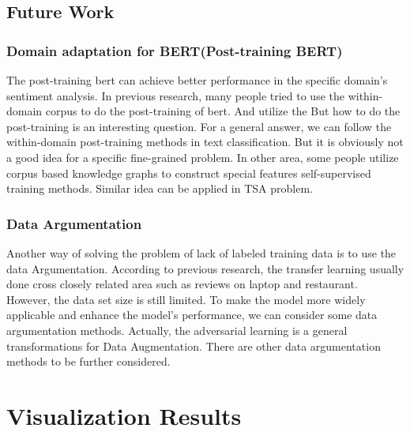 \documentclass[fyp]{socreport}
\begin{document}
\section{Future Work}
\subsection{Domain adaptation for BERT(Post-training BERT)}
The post-training bert can achieve better performance in the specific domain's sentiment analysis. In previous research, many people tried to use the within-domain corpus to do the post-training of bert. And utilize the
But how to do the post-training is an interesting question. For a general answer, we can follow the within-domain post-training methods in text classification. But it is obviously not a good idea for a specific fine-grained problem. In other area, some people utilize corpus based knowledge graphs to construct special features self-supervised training methods. Similar idea can be applied in TSA problem.


\subsection{Data Argumentation}
Another way of solving the problem of lack of labeled training data is to use the data Argumentation. According to previous research, the transfer learning usually done cross closely related area such as reviews on laptop and restaurant. However, the data set size is still limited. To make the model more widely applicable and enhance the model's performance, we can consider some data argumentation methods. Actually, the adversarial learning is a general transformations for Data Augmentation. There are other data argumentation methods to be further considered.







% 
% 


\appendix
\chapter{Visualization Results}
\end{document}
